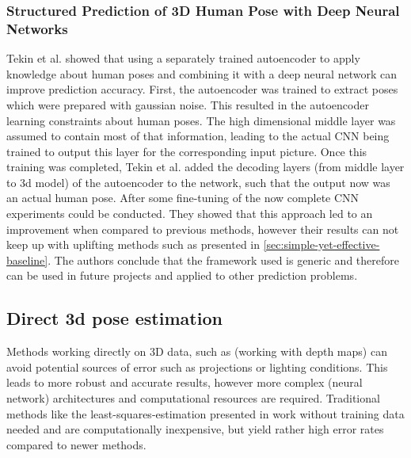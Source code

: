 \subsubsection{Structured Prediction of 3D Human Pose with Deep Neural Networks}
Tekin et al. \cite{Tekin2016} showed that using a separately trained autoencoder to apply knowledge about human poses and combining it with a deep neural network can improve prediction accuracy. First, the autoencoder was trained to extract poses which were prepared with gaussian noise. This resulted in the autoencoder learning constraints about human poses. The high dimensional middle layer was assumed to contain most of that information, leading to the actual CNN being trained to output this layer for the corresponding input picture. Once this training was completed, Tekin et al. added the decoding layers (from middle layer to 3d model) of the autoencoder to the network, such that the output now was an actual human pose. After some fine-tuning of the now complete CNN experiments could be conducted.
They showed that this approach led to an improvement when compared to previous methods, however their results can not keep up with uplifting methods such as presented in \autoref{sec:simple-yet-effective-baseline}. The authors conclude that the framework used is generic and therefore can be used in future projects and applied to other prediction problems.


\subsection{Direct 3d pose estimation}
Methods working directly on 3D data, such as \cite{Ye2011} (working with depth maps) can avoid potential sources of error such as projections or lighting conditions. This leads to more robust and accurate results, however more complex (neural network) architectures and computational resources are required. Traditional methods like the least-squares-estimation presented in \cite{Haralick98} work without training data needed and are computationally inexpensive, but yield rather high error rates compared to newer methods.

